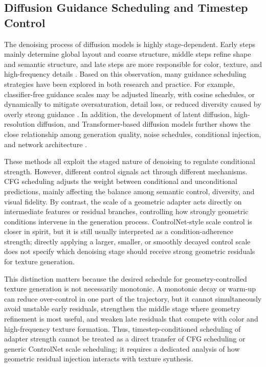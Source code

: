 \documentclass[times,twocolumn,final]{elsarticle}
\begin{document}
\subsection{Diffusion Guidance Scheduling and Timestep Control}
\label{subsec:guidance}

The denoising process of diffusion models is highly stage-dependent. Early steps mainly determine global layout and coarse structure, middle steps refine shape and semantic structure, and late steps are more responsible for color, texture, and high-frequency details \cite{ho2020ddpm,song2021ddim}. Based on this observation, many guidance scheduling strategies have been explored in both research and practice. For example, classifier-free guidance scales may be adjusted linearly, with cosine schedules, or dynamically to mitigate oversaturation, detail loss, or reduced diversity caused by overly strong guidance \cite{ho2022cfg,castillo2023adaptive}. In addition, the development of latent diffusion, high-resolution diffusion, and Transformer-based diffusion models further shows the close relationship among generation quality, noise schedules, conditional injection, and network architecture \cite{rombach2022ldm,esser2024scaling,blackforestlabs2024flux,loshchilov2019decoupled,cherti2023reproducible,nichol2022glide,saharia2022photorealistic,peebles2023scalable}.

These methods all exploit the staged nature of denoising to regulate conditional strength. However, different control signals act through different mechanisms. CFG scheduling adjusts the weight between conditional and unconditional predictions, mainly affecting the balance among semantic control, diversity, and visual fidelity. By contrast, the scale of a geometric adapter acts directly on intermediate features or residual branches, controlling how strongly geometric conditions intervene in the generation process. ControlNet-style scale control is closer in spirit, but it is still usually interpreted as a condition-adherence strength; directly applying a larger, smaller, or smoothly decayed control scale does not specify which denoising stage should receive strong geometric residuals for texture generation.

This distinction matters because the desired schedule for geometry-controlled texture generation is not necessarily monotonic. A monotonic decay or warm-up can reduce over-control in one part of the trajectory, but it cannot simultaneously avoid unstable early residuals, strengthen the middle stage where geometry refinement is most useful, and weaken late residuals that compete with color and high-frequency texture formation. Thus, timestep-conditioned scheduling of adapter strength cannot be treated as a direct transfer of CFG scheduling or generic ControlNet scale scheduling; it requires a dedicated analysis of how geometric residual injection interacts with texture synthesis.
\end{document}
